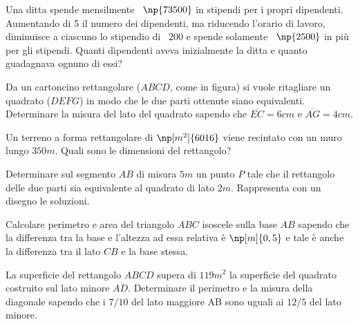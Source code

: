 \begin{multicols}{2}
\begin{esercizio}[\Ast]
 \label{ese:3.134}
Una ditta spende mensilmente \officialeuro~$\np{73500}$ in stipendi per i propri dipendenti.
Aumentando di 5 il numero dei dipendenti, ma riducendo l'orario di lavoro,
diminuisce a ciascuno lo stipendio di \officialeuro~$200$ e spende solamente \officialeuro~$\np{2500}$ in più per
gli stipendi. Quanti dipendenti aveva inizialmente la ditta e quanto
guadagnava ognuno di essi?
\end{esercizio}

\begin{esercizio}[\Ast]
 \label{ese:3.135}
Da un cartoncino rettangolare ($ ABCD $, come in figura) si vuole ritagliare un
quadrato ($ DEFG $) in modo che le due parti ottenute siano equivalenti.
Determinare la misura del lato del quadrato sapendo che
$\overline {EC} = 6\unit{cm} $ e $\overline {AG} = 4\unit{cm}$.
\begin{center}
 
\end{center}
\end{esercizio}

\begin{esercizio}[\Ast]
 \label{ese:3.136}
Un terreno a forma rettangolare di $\np[m^2]{6016}$ viene recintato con un muro lungo
$350\unit{m}$. Quali sono le dimensioni del rettangolo?
\end{esercizio}

\begin{esercizio}[\Ast]
 \label{ese:3.137}
Determinare sul segmento $ AB $ di misura $ 5\unit{m} $ un punto $ P $ tale che il rettangolo
delle due parti sia equivalente al quadrato di lato $ 2\unit{m} $. Rappresenta con un
disegno le soluzioni.
\end{esercizio}

\begin{esercizio}[\Ast]
 \label{ese:3.138}
Calcolare perimetro e area del triangolo $ ABC $ isoscele sulla base $ AB $ sapendo
che la differenza tra la base e l'altezza ad essa relativa è $\np[m]{0,5}$ e tale
è anche la differenza tra il lato $ CB $ e la base stessa.
\end{esercizio}

\begin{esercizio}[\Ast]
 \label{ese:3.139}
La superficie del rettangolo $ ABCD $ supera di $ 119\unit{m^2} $ la superficie del quadrato
costruito sul lato minore $ AD $. Determinare il perimetro e la misura della
diagonale sapendo che i $ 7/10 $ del lato maggiore AB sono uguali ai $ 12/5 $ del
lato minore.
\end{esercizio}


\end{multicols}
